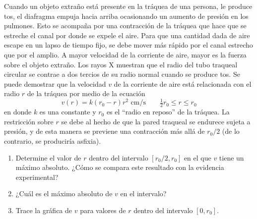\item Cuando un objeto extraño está presente en la tráquea de una persona, le produce tos, el diafragma empuja hacia arriba ocasionando un aumento de presión en los pulmones. Esto se acompaña por una contracción de la tráquea que hace que se estreche el canal por donde se expele el aire. Para que una cantidad dada de aire escape en un lapso de tiempo fijo, se debe mover más rápido por el canal estrecho que por el amplio. A mayor velocidad de la corriente de aire, mayor es la fuerza sobre el objeto extraño. Los rayos X muestran que el radio del tubo traqueal circular se contrae a dos tercios de su radio normal cuando se produce tos. Se puede demostrar que la velocidad $v$ de la corriente de aire está relacionada con el radio $r$ de la tráquea por medio de la ecuación
$$v(r) = k(r_0 - r)r^2 \text{ cm/s} \qquad \tfrac{1}{2}r_0 \le r \le r_0$$
en donde $k$ es una constante y $r_0$ es el ``radio en reposo'' de la tráquea. La restricción sobre $r$ se debe al hecho de que la pared traqueal se endurece sujeta a presión, y de esta manera se previene una contracción más allá de $r_0/2$ (de lo contrario, se produciría asfixia).
\begin{enumerate}
    \item[(a)] Determine el valor de $r$ dentro del intervalo $[r_0/2, r_0]$ en el que $v$ tiene un máximo absoluto. ¿Cómo se compara este resultado con la evidencia experimental?
    \item[(b)] ¿Cuál es el máximo absoluto de $v$ en el intervalo?
    \item[(c)] Trace la gráfica de $v$ para valores de $r$ dentro del intervalo $[0, r_0]$.
\end{enumerate}
